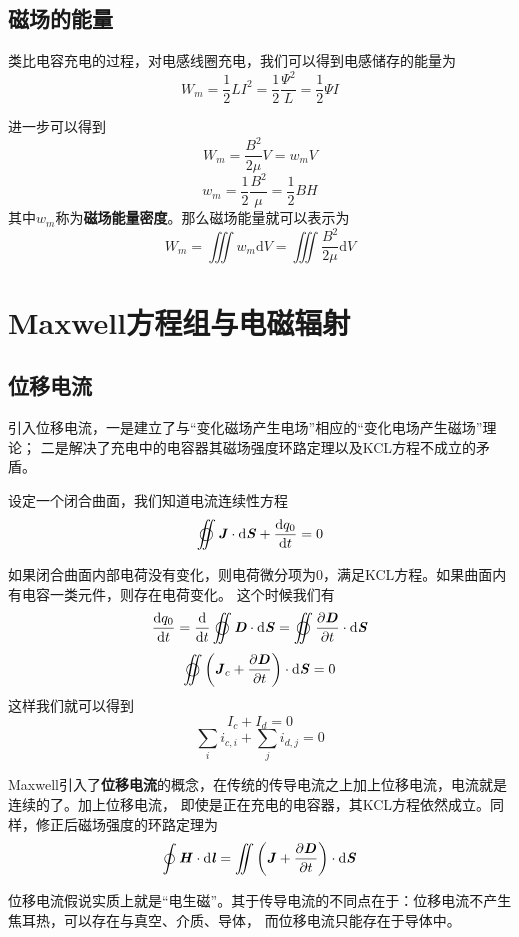 \documentclass[UTF8,openany]{book}
\begin{document}
	\section{磁场的能量}
	\par 类比电容充电的过程，对电感线圈充电，我们可以得到电感储存的能量为
	\[
	W_{m}=\frac{1}{2}LI^2=\frac{1}{2}\frac{\Psi^2}{L}=\frac{1}{2}\Psi I
	\]
	\par 进一步可以得到
	\[
	W_{m}=\frac{B^2}{2\mu}V=w_{m}V	
	\]
	\[
	w_m=\frac{1}{2}\frac{B^2}{\mu}=\frac{1}{2}BH	
	\]
	其中$w_{m}$称为\textbf{磁场能量密度}。那么磁场能量就可以表示为
	\[
	W_{m}=\iiint w_{m}\mathrm{d}V=\iiint\frac{B^2}{2\mu}\mathrm{d}V	
	\]
	
	\chapter{Maxwell方程组与电磁辐射}
	\section{位移电流}
	\par 引入位移电流，一是建立了与“变化磁场产生电场”相应的“变化电场产生磁场”理论；
	二是解决了充电中的电容器其磁场强度环路定理以及KCL方程不成立的矛盾。
	\par 设定一个闭合曲面，我们知道电流连续性方程
	\[
	\varoiint\textbf{\textit{J}}\cdot\mathrm{d}\textbf{\textit{S}}+
	\frac{\mathrm{d}q_0}{\mathrm{d}t}=0	
	\]
	\par 如果闭合曲面内部电荷没有变化，则电荷微分项为0，满足KCL方程。如果曲面内有电容一类元件，则存在电荷变化。
	这个时候我们有
	\[
	\frac{\mathrm{d}q_0}{\mathrm{d}t}=\frac{\mathrm{d}}{\mathrm{d}t}\varoiint\textbf{\textit{D}}\cdot\mathrm{d}
	\textbf{\textit{S}}=
	\varoiint\frac{\partial\textbf{\textit{D}}}{\partial t}\cdot\mathrm{d}\textbf{\textit{S}}	
	\]
	\[
	\varoiint\left(\textbf{\textit{J}}_c+\frac{\partial\textbf{\textit{D}}}{\partial t}\right)\cdot\mathrm{d}
	\textbf{\textit{S}}=0	
	\]
	这样我们就可以得到
	\[
	I_c+I_d=0	
	\]
	\[
	\sum_{i}i_{c,i}+\sum_{j}i_{d,j}=0	
	\]
	\par Maxwell引入了\textbf{位移电流}的概念，在传统的传导电流之上加上位移电流，电流就是连续的了。加上位移电流，
	即使是正在充电的电容器，其KCL方程依然成立。同样，修正后磁场强度的环路定理为
	\[
	\oint\textbf{\textit{H}}\cdot\mathrm{d}\textbf{\textit{l}}=
	\iint\left(\textbf{\textit{J}}+\frac{\partial\textbf{\textit{D}}}{\partial t}\right)\cdot\mathrm{d}\textbf{\textit{S}}
	\]
	\par 位移电流假说实质上就是“电生磁”。其于传导电流的不同点在于：位移电流不产生焦耳热，可以存在与真空、介质、导体，
	而位移电流只能存在于导体中。
\end{document}
